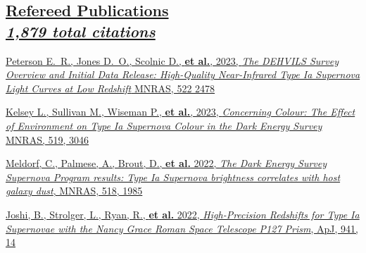 \documentclass[margin]{res}
\begin{document}
\begin{resume}
\section{
\href{https://ui.adsabs.harvard.edu/search/filter_property_fq_property=AND&filter_property_fq_property=property\%3A\%22refereed\%22&fq=\%7B!type\%3Daqp\%20v\%3D\%24fq_property\%7D&fq_property=(property\%3A\%22refereed\%22)&p_=0&q=orcid\%3A0000-0002-1873-8973&sort=citation_count\%20desc\%2C\%20bibcode\%20desc}
{Refereed Publications\\  
\normalfont \textit{\small{\hspace{-0.3em}
1,879 total citations
}}}
}


\hangindent=15pt 
\href{https://ui.adsabs.harvard.edu/link_gateway/2023arXiv230111868P/EPRINT_HTML}{Peterson E.~R., Jones D.~O., Scolnic D., \textbf{et al.}, 2023, {\sl The DEHVILS Survey Overview and Initial Data Release: High-Quality Near-Infrared Type Ia Supernova Light Curves at Low Redshift} MNRAS, 522 2478}%
\vspace{-12pt}

\hangindent=15pt 
\href{https://academic.oup.com/mnras/article/519/2/3046/6939845}{Kelsey L., Sullivan M., Wiseman P., \textbf{et al.}, 2023, {\sl Concerning Colour: The Effect of Environment on Type Ia Supernova Colour in the Dark Energy Survey} MNRAS, 519, 3046}
\vspace{-12pt}

\hangindent=15pt 
\href{https://ui.adsabs.harvard.edu/abs/2022arXiv220606928M/abstract}{Meldorf, C., Palmese, A.,  Brout, D., \textbf{et al.} 2022, {\sl The Dark Energy Survey Supernova Program results: Type Ia Supernova brightness correlates with host galaxy dust}, MNRAS, 518, 1985} %
\vspace{-24pt}

\hangindent=15pt 
\href{https://ui.adsabs.harvard.edu/abs/2022arXiv220512949J/abstract}{Joshi, B., Strolger, L.,  Ryan, R., \textbf{et al.} 2022, {\sl High-Precision Redshifts for Type Ia Supernovae with the Nancy Grace Roman Space Telescope P127 Prism}, ApJ, 941, 14}%
\vspace{-12pt}


\end{resume}
\end{document}
